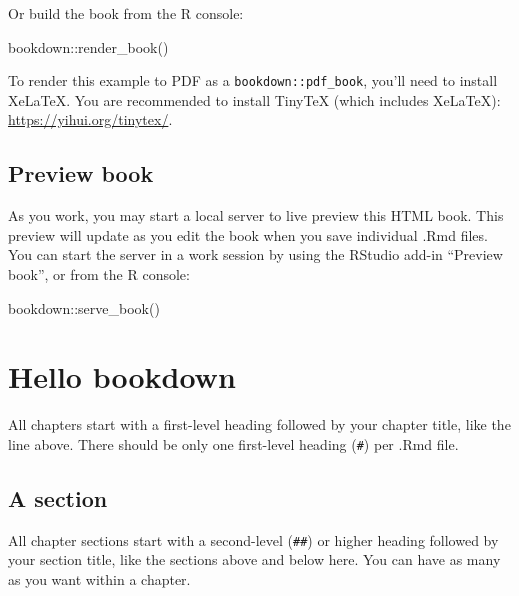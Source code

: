 \documentclass[
]{book}
\newenvironment{Shaded}{\begin{snugshade}}{\end{snugshade}}
\newcommand{\FunctionTok}[1]{\textcolor[rgb]{0.00,0.00,0.00}{#1}}
\newcommand{\NormalTok}[1]{#1}
\newcommand{\SpecialCharTok}[1]{\textcolor[rgb]{0.00,0.00,0.00}{#1}}
\theoremstyle{definition}
\theoremstyle{definition}
\theoremstyle{definition}
\theoremstyle{definition}
\theoremstyle{remark}
\begin{document}
Or build the book from the R console:

\begin{Shaded}
\begin{Highlighting}[]
\NormalTok{bookdown}\SpecialCharTok{::}\FunctionTok{render\_book}\NormalTok{()}
\end{Highlighting}
\end{Shaded}

To render this example to PDF as a \texttt{bookdown::pdf\_book}, you'll need to install XeLaTeX. You are recommended to install TinyTeX (which includes XeLaTeX): \url{https://yihui.org/tinytex/}.

\hypertarget{preview-book}{%
\section{Preview book}\label{preview-book}}

As you work, you may start a local server to live preview this HTML book. This preview will update as you edit the book when you save individual .Rmd files. You can start the server in a work session by using the RStudio add-in ``Preview book'', or from the R console:

\begin{Shaded}
\begin{Highlighting}[]
\NormalTok{bookdown}\SpecialCharTok{::}\FunctionTok{serve\_book}\NormalTok{()}
\end{Highlighting}
\end{Shaded}

\hypertarget{hello-bookdown}{%
\chapter{Hello bookdown}\label{hello-bookdown}}

All chapters start with a first-level heading followed by your chapter title, like the line above. There should be only one first-level heading (\texttt{\#}) per .Rmd file.

\hypertarget{a-section}{%
\section{A section}\label{a-section}}

All chapter sections start with a second-level (\texttt{\#\#}) or higher heading followed by your section title, like the sections above and below here. You can have as many as you want within a chapter.
\end{document}
